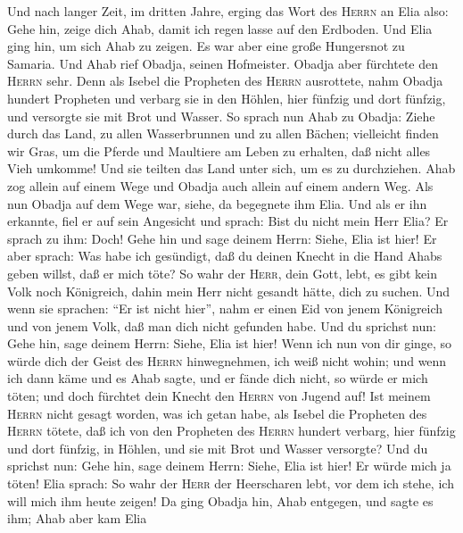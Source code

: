  Und nach langer Zeit, im dritten Jahre, erging das Wort
des \textsc{Herrn} an Elia also: Gehe hin, zeige dich Ahab, damit ich
regen lasse auf den Erdboden.  Und Elia ging hin, um sich
Ahab zu zeigen. Es war aber eine große Hungersnot zu Samaria.
 Und Ahab rief Obadja, seinen Hofmeister. Obadja aber
fürchtete den \textsc{Herrn} sehr.  Denn als Isebel die
Propheten des \textsc{Herrn} ausrottete, nahm Obadja hundert Propheten
und verbarg sie in den Höhlen, hier fünfzig und dort fünfzig, und
versorgte sie mit Brot und Wasser.  So sprach nun Ahab zu
Obadja: Ziehe durch das Land, zu allen Wasserbrunnen und zu allen
Bächen; vielleicht finden wir Gras, um die Pferde und Maultiere am Leben
zu erhalten, daß nicht alles Vieh umkomme!  Und sie
teilten das Land unter sich, um es zu durchziehen. Ahab zog allein auf
einem Wege und Obadja auch allein auf einem andern Weg. 
Als nun Obadja auf dem Wege war, siehe, da begegnete ihm Elia. Und als
er ihn erkannte, fiel er auf sein Angesicht und sprach: Bist du nicht
mein Herr Elia?  Er sprach zu ihm: Doch! Gehe hin und sage
deinem Herrn: Siehe, Elia ist hier!  Er aber sprach: Was
habe ich gesündigt, daß du deinen Knecht in die Hand Ahabs geben willst,
daß er mich töte?  So wahr der \textsc{Herr}, dein Gott,
lebt, es gibt kein Volk noch Königreich, dahin mein Herr nicht gesandt
hätte, dich zu suchen. Und wenn sie sprachen: ``Er ist nicht hier'',
nahm er einen Eid von jenem Königreich und von jenem Volk, daß man dich
nicht gefunden habe.  Und du sprichst nun: Gehe hin, sage
deinem Herrn: Siehe, Elia ist hier!  Wenn ich nun von dir
ginge, so würde dich der Geist des \textsc{Herrn} hinwegnehmen, ich weiß
nicht wohin; und wenn ich dann käme und es Ahab sagte, und er fände dich
nicht, so würde er mich töten; und doch fürchtet dein Knecht den
\textsc{Herrn} von Jugend auf!  Ist meinem \textsc{Herrn}
nicht gesagt worden, was ich getan habe, als Isebel die Propheten des
\textsc{Herrn} tötete, daß ich von den Propheten des \textsc{Herrn}
hundert verbarg, hier fünfzig und dort fünfzig, in Höhlen, und sie mit
Brot und Wasser versorgte?  Und du sprichst nun: Gehe
hin, sage deinem Herrn: Siehe, Elia ist hier! Er würde mich ja töten!
 Elia sprach: So wahr der \textsc{Herr} der Heerscharen
lebt, vor dem ich stehe, ich will mich ihm heute zeigen! 
Da ging Obadja hin, Ahab entgegen, und sagte es ihm; Ahab aber kam Elia
